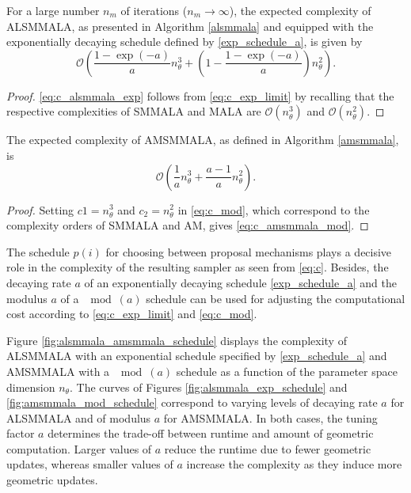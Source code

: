 \documentclass[twoside,11pt]{article}
\begin{document}
{\begin{lemma}
For a large number $n_m$ of iterations ($n_m\rightarrow\infty$), the expected complexity of ALSMMALA, as presented in 
Algorithm \ref{alsmmala} and equipped with the exponentially decaying schedule defined by \eqref{exp_schedule_a}, is given by
\begin{equation}
\label{eq:c_alsmmala_exp}
\mathcal{O}\left(
\dfrac{1-\exp{(-a)}}{a}n_{\theta}^3+
\left(1-\dfrac{1-\exp{(-a)}}{a}\right)n_{\theta}^2
\right).
\end{equation}
\end{lemma}

\begin{proof}
\eqref{eq:c_alsmmala_exp} follows from \eqref{eq:c_exp_limit} by recalling that the respective complexities of SMMALA and 
MALA are $\mathcal{O}(n_{\theta}^3)$ and $\mathcal{O}(n_{\theta}^2)$.
\end{proof}

\begin{lemma}
The expected complexity of AMSMMALA, as defined in Algorithm \ref{amsmmala}, is
\begin{equation}
\label{eq:c_amsmmala_mod}
\mathcal{O}\left(
\dfrac{1}{a}n_{\theta}^3+
\dfrac{a-1}{a}n_{\theta}^2
\right).
\end{equation}
\end{lemma}

\begin{proof}
Setting $c1=n_{\theta}^3$ and $c_2=n_{\theta}^2$ in \eqref{eq:c_mod}, which correspond to the complexity orders of SMMALA 
and AM, gives \eqref{eq:c_amsmmala_mod}.
\end{proof}

The schedule $p(i)$ for choosing between proposal mechanisms plays a decisive role in the complexity of the resulting sampler
as seen from \eqref{eq:c}. Besides, the decaying rate $a$ of an exponentially decaying schedule \eqref{exp_schedule_a} and 
the modulus $a$ of a $\mod{(a)}$ schedule can be used for adjusting the computational cost according to 
\eqref{eq:c_exp_limit} and \eqref{eq:c_mod}.

Figure \ref{fig:alsmmala_amsmmala_schedule} displays the complexity of ALSMMALA with an exponential schedule specified by
\eqref{exp_schedule_a} and AMSMMALA with a $\mod{(a)}$ schedule as a function of the parameter space dimension $n_{\theta}$.
The curves of Figures \ref{fig:alsmmala_exp_schedule} and \ref{fig:amsmmala_mod_schedule} correspond to varying levels of 
decaying rate $a$ for ALSMMALA and of modulus $a$ for AMSMMALA. In both cases, the tuning factor $a$ determines the 
trade-off between runtime and amount of geometric computation. Larger values of $a$ reduce the runtime due to fewer 
geometric updates, whereas smaller values of $a$ increase the complexity as they induce more geometric updates.

}
\end{document}
